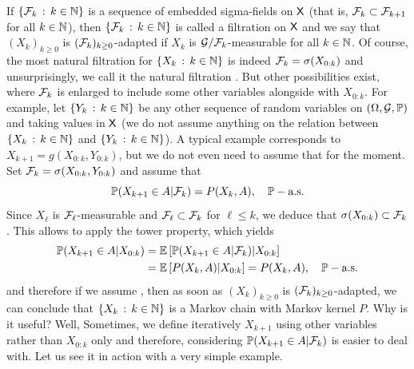 \documentclass[english,graybox,envcountchap,envcountsame,sectrefs,shortlabels]{svmono}
\theoremstyle{style}
\begin{document}
If $\left\{ \mathcal{F}_{k}\,:\,k\in\mathbb{N}\right\}$
is a sequence of embedded sigma-fields on $\mathsf{X}$ (that is, $\mathcal{F}_{k}\subset\mathcal{F}_{k+1}$
for all $k\in\mathbb{N}$), then $\left\{ \mathcal{F}_{k}\,:\,k\in\mathbb{N}\right\}$ is called a filtration 
on $\mathsf{X}$ and we say that $(X_{k})_{k\geq0}$ is $(\mathcal{F}_{k})_{k\geq0}$-adapted
if $X_{k}$ is $\mathcal{G}/\mathcal{F}_{k}$-measurable for all $k\in\mathbb{N}$. Of
course, the most natural filtration for $\left\{ X_{k}\,:\,k\in\mathbb{N}\right\}$
is indeed $\mathcal{F}_{k}=\sigma(X_{0:k})$ and unsurprisingly, we call
it the natural filtration . But other possibilities exist,
where $\mathcal{F}_{k}$ is enlarged to include some other variables alongside
with $X_{0:k}$. For example, let $\left\{ Y_{k}\,:\,k\in\mathbb{N}\right\}$ be any
other sequence of random variables on $(\Omega,\mathcal{G},\mathbb{P})$ and taking
values in $\mathsf{X}$ (we do not assume anything on the relation between  $\left\{ X_{k}\,:\,k\in\mathbb{N}\right\}$ and $\left\{ Y_{k}\,:\,k\in\mathbb{N}\right\}$). A typical example corresponds
to $X_{k+1}=g(X_{0:k},Y_{0:k})$, but we do not even need to assume
that for the moment. Set $\mathcal{F}_{k}=\sigma(X_{0:k},Y_{0:k})$ and assume
that
\begin{equation}
\mathbb{P}(X_{k+1}\in A|\mathcal{F}_{k})=P(X_{k},A),\quad\mathbb{P}-\mbox{a.s.}\label{eq:def:MC:F-k}
\end{equation}
Since $X_{\ell}$ is $\mathcal{F}_{\ell}$-measurable and $\mathcal{F}_{\ell}\subset\mathcal{F}_{k}$
for $\ell\leq k$, we deduce that $\sigma(X_{0:k})\subset\mathcal{F}_{k}$.
This allows to apply the tower property, which yields
\begin{align*}
\mathbb{P}(X_{k+1}\in A|X_{0:k}) & =\mathbb{E}\left[\mathbb{P}(X_{k+1}\in A|\mathcal{F}_{k})|X_{0:k}\right]\\
 & =\mathbb{E}\left[P(X_{k},A)|X_{0:k}\right]=P(X_{k},A),\quad\mathbb{P}-\mbox{a.s.}
\end{align*}
and therefore if we assume , then as soon as $(X_{k})_{k\geq0}$
is $(\mathcal{F}_{k})_{k\geq0}$-adapted, we can conclude that $\left\{ X_{k}\,:\,k\in\mathbb{N}\right\}$
is a Markov chain with Markov kernel $P$. Why is it useful? Well,
Sometimes, we define iteratively $X_{k+1}$ using other variables
rather than $X_{0:k}$ only and therefore, considering $\mathbb{P}(X_{k+1}\in A|\mathcal{F}_{k})$
is easier to deal with. Let us see it in action with a very simple
example.
\end{document}
